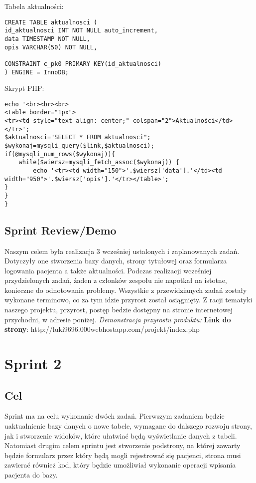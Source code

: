 \documentclass[a4paper]{article} \usepackage{polski} \usepackage[cp1250]{inputenc} \usepackage{url}
\begin{document}
Tabela aktualności:
\begin{verbatim}
CREATE TABLE aktualnosci (
id_aktualnosci INT NOT NULL auto_increment,
data TIMESTAMP NOT NULL,
opis VARCHAR(50) NOT NULL,

CONSTRAINT c_pk0 PRIMARY KEY(id_aktualnosci)
) ENGINE = InnoDB;
\end{verbatim}
Skrypt PHP:
\begin{verbatim}
echo '<br><br><br>
<table border="1px">
<tr><td style="text-align: center;" colspan="2">Aktualności</td></tr>';
$aktualnosci="SELECT * FROM aktualnosci";
$wykonaj=mysqli_query($link,$aktualnosci);
if(@mysqli_num_rows($wykonaj)){
	while($wiersz=mysqli_fetch_assoc($wykonaj)) {
		echo '<tr><td width="150">'.$wiersz['data'].'</td><td width="950">'.$wiersz['opis'].'</tr></table>';
}
}
}
\end{verbatim}

\subsection{Sprint Review/Demo} Naszym celem była realizacja 3 wcześniej ustalonych i zaplanowanych zadań. Dotyczyły one stworzenia bazy danych, strony tytułowej oraz formularza logowania pacjenta a także aktualności. Podczas realizacji wcześniej przydzielonych zadań, żaden z członków zespołu nie napotkał na istotne, konieczne do odnotowania problemy. Wszystkie z przewidzianych zadań zostały wykonane terminowo, co za tym idzie przyrost  został osiągnięty. Z racji tematyki naszego projektu, przyrost, postęp bedzie dostępny na stronie internetowej przychodni, w adresie poniżej.\newline
\newline
\textit{Demonstracja przyrostu produktu:}\newline
\newline
\textbf{Link do strony}: http://luki9696.000webhostapp.com/projekt/index.php
 
   

\section{Sprint 2}
\label{Sprint22}
\subsection{Cel}\label{Sprint2cel} Sprint ma na celu wykonanie dwóch zadań. Pierwszym zadaniem będzie uaktualnienie bazy danych o nowe tabele, wymagane do dalszego rozwoju strony, jak i stworzenie widoków, które ułatwiać będą wyświetlanie danych z tabeli. Natomiast drugim celem sprintu jest stworzenie podstrony, na której zawarty będzie formularz przez który będą mogli rejestrować się pacjenci, strona musi zawierać również kod, który będzie umożliwiał wykonanie operacji wpisania pacjenta do bazy.
\end{document}
